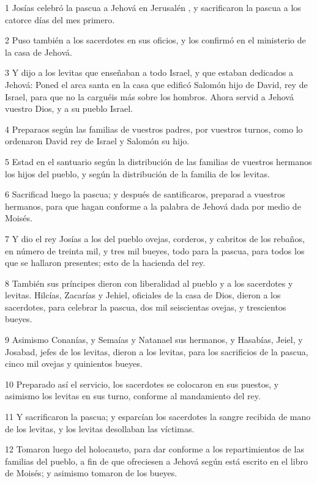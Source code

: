 \par 1 Josías celebró la pascua a Jehová en Jerusalén , y sacrificaron la pascua a los catorce días del mes primero.
\par 2 Puso también a los sacerdotes en sus oficios, y los confirmó en el ministerio de la casa de Jehová.
\par 3 Y dijo a los levitas que enseñaban a todo Israel, y que estaban dedicados a Jehová: Poned el arca santa en la casa que edificó Salomón hijo de David, rey de Israel, para que no la carguéis más sobre los hombros. Ahora servid a Jehová vuestro Dios, y a su pueblo Israel.
\par 4 Preparaos según las familias de vuestros padres, por vuestros turnos, como lo ordenaron David rey de Israel y Salomón su hijo. 
\par 5 Estad en el santuario según la distribución de las familias de vuestros hermanos los hijos del pueblo, y según la distribución de la familia de los levitas.
\par 6 Sacrificad luego la pascua; y después de santificaros, preparad a vuestros hermanos, para que hagan conforme a la palabra de Jehová dada por medio de Moisés.
\par 7 Y dio el rey Josías a los del pueblo ovejas, corderos, y cabritos de los rebaños, en número de treinta mil, y tres mil bueyes, todo para la pascua, para todos los que se hallaron presentes; esto de la hacienda del rey.
\par 8 También sus príncipes dieron con liberalidad al pueblo y a los sacerdotes y levitas. Hilcías, Zacarías y Jehiel, oficiales de la casa de Dios, dieron a los sacerdotes, para celebrar la pascua, dos mil seiscientas ovejas, y trescientos bueyes.
\par 9 Asimismo Conanías, y Semaías y Natanael sus hermanos, y Hasabías, Jeiel, y Josabad, jefes de los levitas, dieron a los levitas, para los sacrificios de la pascua, cinco mil ovejas y quinientos bueyes.
\par 10 Preparado así el servicio, los sacerdotes se colocaron en sus puestos, y asimismo los levitas en sus turno, conforme al mandamiento del rey.
\par 11 Y sacrificaron la pascua; y esparcían los sacerdotes la sangre recibida de mano de los levitas, y los levitas desollaban las víctimas.
\par 12 Tomaron luego del holocausto, para dar conforme a los repartimientos de las familias del pueblo, a fin de que ofreciesen a Jehová según está escrito en el libro de Moisés; y asimismo tomaron de los bueyes.
